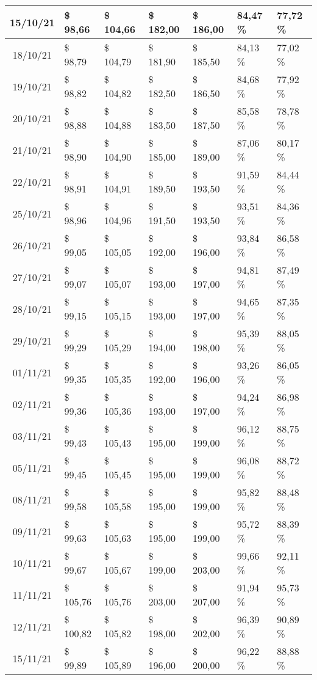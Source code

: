 \begin{center}
\begin{longtable}{|c|p{1.5cm}|p{1.5cm}|p{1.5cm}|p{1.5cm}|p{1.5cm}|p{1.5cm}|}
15/10/21 & \$ 98,66 & \$ 104,66 & \$ 182,00 & \$ 186,00 & 84,47 \% & 77,72 \% \\ \hline
18/10/21 & \$ 98,79 & \$ 104,79 & \$ 181,90 & \$ 185,50 & 84,13 \% & 77,02 \% \\ \hline
19/10/21 & \$ 98,82 & \$ 104,82 & \$ 182,50 & \$ 186,50 & 84,68 \% & 77,92 \% \\ \hline
20/10/21 & \$ 98,88 & \$ 104,88 & \$ 183,50 & \$ 187,50 & 85,58 \% & 78,78 \% \\ \hline
21/10/21 & \$ 98,90 & \$ 104,90 & \$ 185,00 & \$ 189,00 & 87,06 \% & 80,17 \% \\ \hline
22/10/21 & \$ 98,91 & \$ 104,91 & \$ 189,50 & \$ 193,50 & 91,59 \% & 84,44 \% \\ \hline
25/10/21 & \$ 98,96 & \$ 104,96 & \$ 191,50 & \$ 193,50 & 93,51 \% & 84,36 \% \\ \hline
26/10/21 & \$ 99,05 & \$ 105,05 & \$ 192,00 & \$ 196,00 & 93,84 \% & 86,58 \% \\ \hline
27/10/21 & \$ 99,07 & \$ 105,07 & \$ 193,00 & \$ 197,00 & 94,81 \% & 87,49 \% \\ \hline
28/10/21 & \$ 99,15 & \$ 105,15 & \$ 193,00 & \$ 197,00 & 94,65 \% & 87,35 \% \\ \hline
29/10/21 & \$ 99,29 & \$ 105,29 & \$ 194,00 & \$ 198,00 & 95,39 \% & 88,05 \% \\ \hline
01/11/21 & \$ 99,35 & \$ 105,35 & \$ 192,00 & \$ 196,00 & 93,26 \% & 86,05 \% \\ \hline
02/11/21 & \$ 99,36 & \$ 105,36 & \$ 193,00 & \$ 197,00 & 94,24 \% & 86,98 \% \\ \hline
03/11/21 & \$ 99,43 & \$ 105,43 & \$ 195,00 & \$ 199,00 & 96,12 \% & 88,75 \% \\ \hline
05/11/21 & \$ 99,45 & \$ 105,45 & \$ 195,00 & \$ 199,00 & 96,08 \% & 88,72 \% \\ \hline
08/11/21 & \$ 99,58 & \$ 105,58 & \$ 195,00 & \$ 199,00 & 95,82 \% & 88,48 \% \\ \hline
09/11/21 & \$ 99,63 & \$ 105,63 & \$ 195,00 & \$ 199,00 & 95,72 \% & 88,39 \% \\ \hline
10/11/21 & \$ 99,67 & \$ 105,67 & \$ 199,00 & \$ 203,00 & 99,66 \% & 92,11 \% \\ \hline
11/11/21 & \$ 105,76 & \$ 105,76 & \$ 203,00 & \$ 207,00 & 91,94 \% & 95,73 \% \\ \hline
12/11/21 & \$ 100,82 & \$ 105,82 & \$ 198,00 & \$ 202,00 & 96,39 \% & 90,89 \% \\ \hline
15/11/21 & \$ 99,89 & \$ 105,89 & \$ 196,00 & \$ 200,00 & 96,22 \% & 88,88 \% \\ \hline

\end{longtable}
\end{center}
